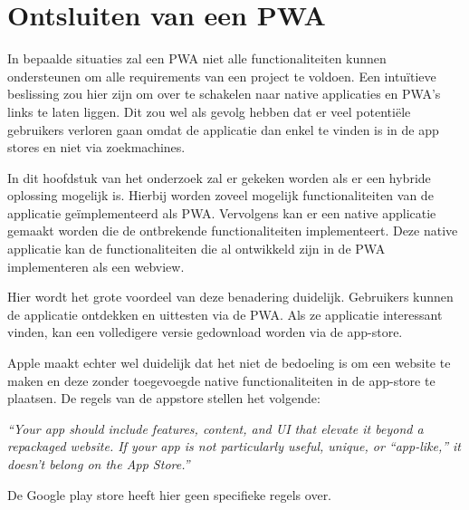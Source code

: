 \section{Ontsluiten van een PWA}
In bepaalde situaties zal een PWA niet alle functionaliteiten kunnen ondersteunen om alle requirements van een project te voldoen. Een intuïtieve beslissing zou hier zijn om over te schakelen naar native applicaties en PWA’s links te laten liggen. Dit zou wel als gevolg hebben dat er veel potentiële gebruikers verloren gaan omdat de applicatie dan enkel te vinden is in de app stores en niet via zoekmachines.

In dit hoofdstuk van het onderzoek zal er gekeken worden als er een hybride oplossing mogelijk is. Hierbij worden zoveel mogelijk functionaliteiten van de applicatie geïmplementeerd als PWA. Vervolgens kan er een native applicatie gemaakt worden die de ontbrekende functionaliteiten implementeert. Deze native applicatie kan de functionaliteiten die al ontwikkeld zijn in de PWA implementeren als een webview. 

Hier wordt het grote voordeel van deze benadering duidelijk. Gebruikers kunnen de applicatie ontdekken en uittesten via de PWA. Als ze applicatie interessant vinden, kan een volledigere versie gedownload worden via de app-store.

Apple maakt echter wel duidelijk dat het niet de bedoeling is om een website te maken en deze zonder toegevoegde native functionaliteiten in de app-store te plaatsen. De regels van de appstore stellen het volgende:

\textit{“Your app should include features, content, and UI that elevate it beyond a repackaged website. If your app is not particularly useful, unique, or “app-like,” it doesn’t belong on the App Store.”}
\autocite{Apple2020c}


De Google play store heeft hier geen specifieke regels over.
\autocite{GooglePlay2020a}